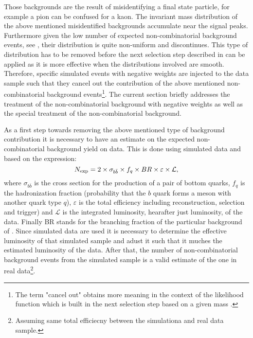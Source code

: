 \noindent Those backgrounds are the result of misidentifying a final state particle, for example a pion can
be confused for a kaon. The invariant mass distribution of the above mentioned misidentified backgrounds
accumulate near the \BJpsiKpi signal peaks. Furthermore given the low number of expected non-combinatorial background events,
see , their distribution is quite non-uniform and discontinues. This type of distribution has to be removed
before the next selection step described in  can be applied as it is more effective
when the distributions involved are smooth. Therefore, specific simulated events with negative weights
are injected to the data sample such that they cancel out the contribution of the above mentioned non-combinatorial background
events\footnote{The term "cancel out" obtains more meaning in the context of the likelihood function which is built in
the next selection step  based on a given mass \pdf. }.
The current section briefly addresses the treatment of the non-combinatorial background with negative weights
as well as the special treatment of the \LbJpsippi non-combinatorial background.

As a first step towards removing the above mentioned type of background contribution it is necessary to have an estimate
on the expected non-combinatorial background yield on data. This is done using simulated data and based on the expression:
\begin{equation}
N_{\rm exp} = 2 \times \sigma_{b\bar{b}}\times f_q \times BR \times \varepsilon \times {\mathcal{L}},
\end{equation}
\noindent where $\sigma_{b\bar{b}}$ is the cross section for the production of a pair of bottom quarks, $f_q$ is the hadronization fraction
(probability that the $b$ quark forms a meson with another quark type $q$), $\varepsilon$ is the total efficiency including reconstruction,
selection and trigger) and ${\mathcal{L}}$ is the integrated luminosity, hearafter just luminosity, of the data. Finally BR stands for the
branching fraction of the particular background of . Since simulated data are used it is necessary to determine
the effective luminosity of that simulated sample and adust it such that it muches the estimated luminosity of the data. After that, the
number of non-combinatorial background events from the simulated sample is a valid estimate of the one in real
data\footnote{Assuming same total efficiecny between the simulationa and real data sample.}.

